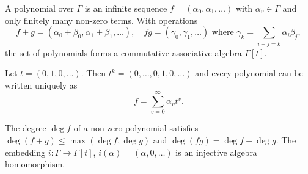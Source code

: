 A polynomial over $\Gamma$ is an infinite sequence $f = (\alpha_0, \alpha_1, \ldots)$ with $\alpha_v \in \Gamma$ and only finitely many non-zero terms. With operations
$$f + g = (\alpha_0 + \beta_0, \alpha_1 + \beta_1, \ldots), \quad fg = (\gamma_0, \gamma_1, \ldots) \text{ where } \gamma_k = \sum_{i+j=k} \alpha_i \beta_j,$$
the set of polynomials forms a commutative associative algebra $\Gamma[t]$.

Let $t = (0, 1, 0, \ldots)$. Then $t^k = (0, \ldots, 0, 1, 0, \ldots)$ and every polynomial can be written uniquely as
$$f = \sum_{v=0}^{\infty} \alpha_v t^v.$$

The degree $\deg f$ of a non-zero polynomial satisfies $\deg(f + g) \leq \max(\deg f, \deg g)$ and $\deg(fg) = \deg f + \deg g$. The embedding $i: \Gamma \to \Gamma[t]$, $i(\alpha) = (\alpha, 0, \ldots)$ is an injective algebra homomorphism.
